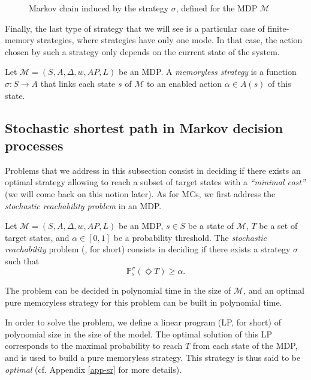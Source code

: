\begin{example}
\begin{figure}[H]
    \caption{Markov chain induced by the strategy $\sigma$, defined for the MDP $\mathcal{M}$}\label{inducedMC}
  \end{figure}
\end{example}

Finally, the last type of strategy that we will see is a particular case of finite-memory strategies, where strategies have only one mode.
In that case, the action chosen by such a strategy only depends on the current state of the system.

\begin{definition}
  Let $\mathcal{M}=(S, A, \Delta, w, AP, L)$ be an MDP. A \textit{memoryless strategy} is a function
  $
    \sigma: S \rightarrow A
  $ that links each state $s$ of $\mathcal{M}$ to an enabled action $\alpha \in A(s)$ of this state.
\end{definition}

\subsection{Stochastic shortest path in Markov decision processes}\label{vssp}
Problems that we address in this subsection consist in deciding if there exists an optimal strategy allowing to reach a subset of target states with a \textit{``minimal cost''} (we will come back on this notion later).
As for MCs, we first address the \textit{stochastic reachability problem} in an MDP.
\begin{definition}
  Let $\mathcal{M}=(S, A, \Delta, w, AP, L)$ be an MDP, $s \in S$ be a state of $\mathcal{M}$, $T$ be a set of target states, and $\alpha \in [0, 1]$ be
  a probability threshold. The \textit{stochastic reachability} problem (\SR{}, for short) consists
  in deciding if there exists a strategy $\sigma$ such that
  \[
    \mathbb{P}_s^\sigma(\Diamond T) \geq \alpha.
  \]
\end{definition}

\begin{theorem}\label{thm-sr}
  The \SR{} problem can be decided in polynomial time in the size of $\mathcal{M}$, and an optimal pure memoryless strategy for this problem can be built in polynomial time.
\end{theorem}

In order to solve the \SR{} problem, we define a linear program (LP, for short) of polynomial size in the size of the model.
The optimal solution of this LP corresponds to the maximal probability to reach $T$ from each state of the MDP, and is used to build a pure memoryless strategy.
This strategy is thus said to be \textit{optimal} (cf. Appendix \ref{app-sr} for more details). \\

